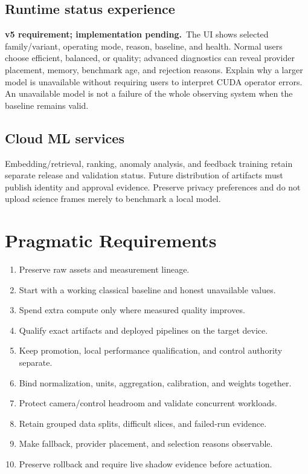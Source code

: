 \documentclass[11pt,a4paper]{article}
\newcommand{\planned}{\textbf{v5 requirement; implementation pending.}\ }
\begin{document}
\subsection{Runtime status experience}
\planned The UI shows selected family/variant, operating mode, reason,
baseline, and health. Normal users choose efficient, balanced, or quality;
advanced diagnostics can reveal provider placement, memory, benchmark age,
and rejection reasons. Explain why a larger model is unavailable without
requiring users to interpret CUDA operator errors. An unavailable model is
not a failure of the whole observing system when the baseline remains valid.

\subsection{Cloud ML services}
Embedding/retrieval, ranking, anomaly analysis, and feedback training retain
separate release and validation status. Future distribution of artifacts must
publish identity and approval evidence. Preserve privacy preferences and do
not upload science frames merely to benchmark a local model.

\section{Pragmatic Requirements}
\begin{enumerate}
\item Preserve raw assets and measurement lineage.
\item Start with a working classical baseline and honest unavailable values.
\item Spend extra compute only where measured quality improves.
\item Qualify exact artifacts and deployed pipelines on the target device.
\item Keep promotion, local performance qualification, and control authority separate.
\item Bind normalization, units, aggregation, calibration, and weights together.
\item Protect camera/control headroom and validate concurrent workloads.
\item Retain grouped data splits, difficult slices, and failed-run evidence.
\item Make fallback, provider placement, and selection reasons observable.
\item Preserve rollback and require live shadow evidence before actuation.
\end{enumerate}
\end{document}
